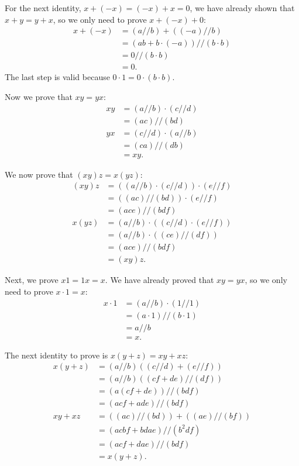 \documentclass[12pt, oneside]{book}
\begin{document}
	For the next identity, $x + (-x) = (-x) + x = 0$, we have already shown that $x + y = y + x$, so we only need to prove $x + (-x) + 0$:
	\[\begin{split}
		x + (-x) &= (a // b) + ((-a) // b) \\
		&= (ab + b \cdot (-a)) // (b \cdot b) \\
		&= 0 // (b \cdot b) \\
		&= 0.
	\end{split}\]
	The last step is valid because $0 \cdot 1 = 0 \cdot (b \cdot b)$.
	
	Now we prove that $xy = yx$:
	\begin{align*}
		xy &= (a // b) \cdot (c // d) \\
		&= (ac) // (bd) \\
		yx &= (c // d) \cdot (a // b) \\
		&= (ca) // (db) \\
		&= xy.
	\end{align*}
	
	We now prove that $(xy)z = x(yz)$:
	\begin{align*}
		(xy)z &= ((a // b) \cdot (c // d)) \cdot (e // f) \\
		&= ((ac) // (bd)) \cdot (e // f) \\
		&= (ace) // (bdf) \\
		x(yz) &= (a // b) \cdot ((c // d) \cdot (e // f)) \\
		&= (a // b) \cdot ((ce) // (df)) \\
		&= (ace) // (bdf) \\
		&= (xy)z.
	\end{align*}
	
	Next, we prove $x1 = 1x = x$. We have already proved that $xy = yx$, so we only need to prove $x \cdot 1 = x$:
	\[\begin{split}
		x \cdot 1 &= (a // b) \cdot (1 // 1) \\
		&= (a \cdot 1) // (b \cdot 1) \\
		&= a // b \\
		&= x.
	\end{split}\]
	
	The next identity to prove is $x(y + z) = xy + xz$:
	\begin{align*}
		x(y + z) &= (a // b)((c // d) + (e // f)) \\
		&= (a // b)((cf + de) // (df)) \\
		&= (a(cf + de)) // (bdf) \\
		&= (acf + ade) // (bdf) \\
		xy + xz &= ((ac) // (bd)) + ((ae) // (bf)) \\
		&= (acbf + bdae) // (b^2 df) \\
		&= (acf + dae) // (bdf) \\
		&= x(y + z).
	\end{align*}
	
\end{document}
